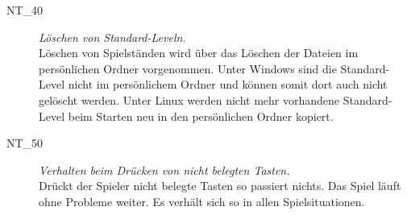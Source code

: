 \begin{description}

\label{NT:40}
	
	\item[NT\_40] \textit{Löschen von Standard-Leveln.} \hfill\\
	
	Löschen von Spielständen wird über das Löschen der Dateien im persönlichen Ordner vorgenommen.
	Unter Windows sind die Standard-Level nicht im persönlichem Ordner und können somit dort auch nicht gelöscht werden.
	Unter Linux werden nicht mehr vorhandene Standard-Level beim Starten neu in den persönlichen Ordner kopiert.\\
	


\label{NT:50}	
	
	\item[NT\_50] \textit{Verhalten beim Drücken von nicht belegten Tasten.} \hfill\\

	Drückt der Spieler nicht belegte Tasten so passiert nichts. Das Spiel läuft ohne Probleme weiter. Es verhält sich so in allen Spielsituationen.\\
	
\end{description}


